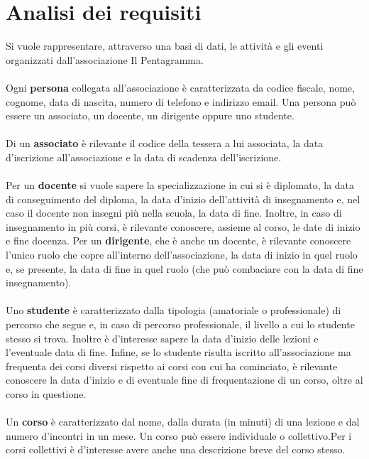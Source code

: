 \documentclass[12pt]{article}
\begin{document}
\section{Analisi dei requisiti}
	Si vuole rappresentare, attraverso una basi di dati, le attività e gli eventi organizzati dall'associazione Il Pentagramma.\\\\
	Ogni \textbf{persona} collegata all'associazione è caratterizzata da codice fiscale, nome, cognome, data di nascita, numero di telefono e indirizzo email. Una persona può essere un associato, un docente, un dirigente oppure uno studente.\\\\
	Di un \textbf{associato} è rilevante il codice della tessera a lui associata, la data d'iscrizione all'associazione e la data di scadenza dell'iscrizione.\\\\
	Per un \textbf{docente} si vuole sapere la specializzazione in cui si è diplomato, la data di conseguimento del diploma, la data d'inizio dell'attività di insegnamento e, nel caso il docente non insegni più nella scuola, la data di fine. Inoltre, in caso di insegnamento in più corsi, è rilevante conoscere, assieme al corso, le date di inizio e fine docenza. Per un \textbf{dirigente}, che è anche un docente, è rilevante conoscere l'unico ruolo che copre all'interno dell'associazione, la data di inizio in quel ruolo e, se presente, la data di fine in quel ruolo (che può combaciare con la data di fine insegnamento).\\\\
	Uno \textbf{studente} è caratterizzato dalla tipologia (amatoriale o professionale) di percorso che segue e, in caso di percorso professionale, il livello a cui lo studente stesso si trova. Inoltre è d'interesse sapere la data d'inizio delle lezioni e l'eventuale data di fine. Infine, se lo studente risulta iscritto all'associazione ma frequenta dei corsi diversi rispetto ai corsi con cui ha cominciato, è rilevante conoscere la data d'inizio e di eventuale fine di frequentazione di un corso, oltre al corso in questione.\\\\
	Un \textbf{corso} è caratterizzato dal nome, dalla durata (in minuti) di una lezione e dal numero d'incontri in un mese. Un corso può essere individuale o collettivo.Per i corsi collettivi è d'interesse avere anche una descrizione breve del corso stesso.\\\\
\end{document}
